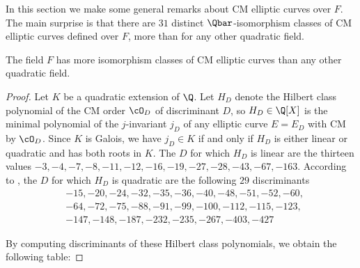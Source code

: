 \documentclass{amsart}
\begin{document}
In this section we make some general remarks about CM elliptic curves
over $F$.  The main surprise is that there are $31$ distinct
$\Qbar$-isomorphism classes of CM elliptic curves defined over $F$,
more than for any other quadratic field.

\begin{proposition}
The field $F$ has more isomorphism classes of CM
elliptic curves than any other quadratic field.
\end{proposition}
\begin{proof}
Let $K$ be a quadratic extension of $\Q$.
Let $H_D$ denote the Hilbert class polynomial of the CM order
$\cO_D$ of discriminant $D$, so $H_D\in \Q[X]$ is the minimal
polynomial of the $j$-invariant $j_D$ of any elliptic curve $E=E_D$ with
CM by $\cO_D$.   Since $K$ is Galois, we have $j_D \in K$ if and only if
$H_D$ is either linear or quadratic and has both roots in $K$.
The $D$ for which $H_D$ is linear are the thirteen values
$-3, -4, -7, -8, -11, -12, -16, -19, -27, -28, -43, -67, -163$.
According to \cite{cremona:abvar}, the
$D$ for which $H_D$ is quadratic are the following $29$
discriminants
\begin{align*}
&-15, -20, -24, -32, -35, -36, -40, -48, -51, -52, -60, \\
&-64, -72, -75, -88, -91, -99, -100, -112, -115, -123, \\
&-147, -148, -187, -232, -235, -267, -403, -427
\end{align*}
 
By computing discriminants of these Hilbert class polynomials,
we obtain the following table:



\end{proof}
\end{document}
